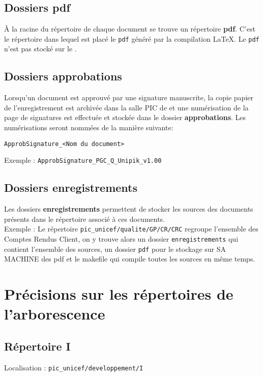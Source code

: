 \subsection{Dossiers pdf}

\`{A} la racine du répertoire de chaque document se trouve un répertoire \textbf{pdf}. C'est
le répertoire dans lequel est placé le \verb+pdf+ généré par la compilation \LaTeX{}. Le \verb+pdf+ n'est pas stocké sur le \git{}.

\subsection{Dossiers approbations}

Lorsqu'un document est approuvé par une signature manuscrite, la copie papier de l'enregistrement est archivée dans la salle PIC de  \nomEquipe{} et une numérisation de la page de signatures est effectuée et stockée dans le dossier \textbf{approbations}. Les numérisations seront nommées de la manière suivante:
\begin{center}
\verb+ApprobSignature_<Nom du document>+
\end{center}

Exemple : \verb+ApprobSignature_PGC_Q_Unipik_v1.00+

\subsection{Dossiers enregistrements}

Les dossiers \textbf{enregistrements} permettent de stocker les sources des documents présents dans le répertoire associé à ces documents.\\
Exemple : Le répertoire \verb+pic_unicef/qualite/GP/CR/CRC+ regroupe l'ensemble des Comptes Rendus Client, on y trouve alors un dossier \verb+enregistrements+ qui contient l'ensemble des sources, un dossier \verb+pdf+ pour le stockage sur SA MACHINE des pdf et le makefile qui compile toutes les sources en même temps.


\section{Précisions sur les répertoires de l'arborescence}

\subsection{Répertoire I}

Localisation : \verb+pic_unicef/developpement/I+\\

